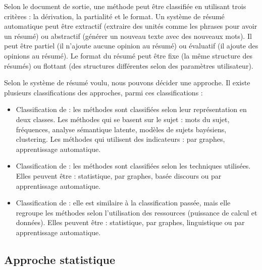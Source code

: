 \documentclass{KodeBook}
\begin{document}
Selon le document de sortie, une méthode peut être classifiée en utilisant trois critères : la dérivation, la partialité et le format.
Un système de résumé automatique peut être extractif (extraire des unités comme les phrases pour avoir un résumé) ou abstractif (générer un nouveau texte avec des nouveaux mots).
Il peut être partiel (il n'ajoute aucune opinion au résumé) ou évaluatif (il ajoute des opinions au résumé).
Le format du résumé peut être fixe (la même structure des résumés) ou flottant (des structures différentes selon des paramètres utilisateur).

Selon le système de résumé voulu, nous pouvons décider une approche. 
Il existe plusieurs classifications des approches, parmi ces classifications :
\begin{itemize}
	\item Classification de \citet{12-nenkova-mckeown} : les méthodes sont classifiées selon leur représentation en deux classes.
	Les méthodes qui se basent sur le sujet : mots du sujet, fréquences, analyse sémantique latente, 
	modèles de sujets bayésiens, clustering.
	Les méthodes qui utilisent des indicateurs : par graphes, apprentissage automatique.
	\item Classification de \citet{12-lloret-palomar} : les méthodes sont classifiées selon les techniques utilisées.
	Elles peuvent être : statistique, par graphes, basée discours ou par apprentissage automatique.
	\item Classification de \citet{19-aries-al} : elle est similaire à la classification passée, mais elle regroupe les méthodes selon l'utilisation des ressources (puissance de calcul et données).
	Elles peuvent être : statistique, par graphes, linguistique ou par apprentissage automatique.
\end{itemize}

\subsection{Approche statistique}
\end{document}
